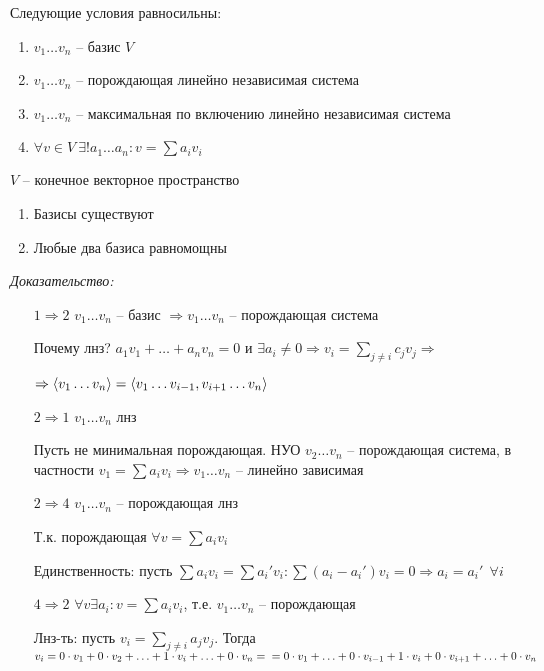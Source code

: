 \documentclass[12pt]{article}
\begin{document}
\begin{theo}{}
    Следующие условия равносильны:

    \begin{enumerate}
        \item $v_1 \ldots v_n$ -- базис $V$
        \item $v_1 \ldots v_n$ -- порождающая линейно независимая система
        \item $v_1 \ldots v_n$ -- максимальная по включению линейно независимая система
        \item $\forall v \in V\ \exists! a_1 \ldots a_n : v = \sum a_iv_i$
    \end{enumerate}
\end{theo}



\begin{theo}{}
    $V$ -- конечное векторное пространство

    \begin{enumerate}
        \item Базисы существуют
        \item Любые два базиса равномощны
    \end{enumerate}
\end{theo}

\textit{Доказательство:}

\begin{enumerate}
    \item[$1 \Rightarrow 2$] $v_1 \ldots v_n$ -- базис $\Rightarrow v_1 \ldots v_n$ -- порождающая система
    
    Почему лнз? $a_1v_1 + \ldots + a_nv_n = 0$ и $\exists a_i \neq 0 \Rightarrow v_i = \sum\limits_{j \neq i} c_jv_j \Rightarrow$

    $\Rightarrow \langle v_1 \ldots v_n \rangle = \langle v_1 \ldots v_{i - 1}, v_{i + 1} \ldots v_n \rangle$

    \item[$2 \Rightarrow 1$] $v_1 \ldots v_n$ лнз
    
    Пусть не минимальная порождающая. НУО $v_2 \ldots v_n$ -- порождающая система, в частности $v_1 = \sum a_iv_i \Rightarrow v_1 \ldots v_n$ -- линейно зависимая 

    \item[$2 \Rightarrow 4$] $v_1 \ldots v_n$ -- порождающая лнз
    
    Т.к. порождающая $\forall v = \sum a_iv_i$

    Единственность: пусть $\sum a_iv_i = \sum a_i'v_i : \sum (a_i - a_i')v_i = 0 \Rightarrow a_i = a_i'\ \ \forall i$

    \item[$4 \Rightarrow 2$] $\forall v \exists a_i : v = \sum a_iv_i$, т.е. $v_1 \ldots v_n$ -- порождающая
    
    Лнз-ть: пусть $v_i = \sum\limits_{j \neq i} a_jv_j$. Тогда $v_i = 0 \cdot v_1 + 0 \cdot v_2 + \ldots + 1 \cdot v_i + \ldots + 0 \cdot v_n = \\ = 0 \cdot v_1 + \ldots + 0 \cdot v_{i - 1} + 1 \cdot v_i + 0 \cdot v_{i + 1} + \ldots + 0 \cdot v_n$
\end{enumerate}
\end{document}
